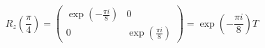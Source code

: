 \begingroup
\newcommand{\expo}[1]{\exp \left( #1 \right)}
\newcommand{\roto}[2]{R_{#1} \left( #2 \right)}
%
$$
\roto{z}{\frac{\pi}{4}} = \begin{pmatrix} \expo{-\frac{\pi i}{8}} & 0 \\ 0 & \expo{\frac{\pi i}{8}} \end{pmatrix} = \expo{-\frac{\pi i}{8}} T
$$
%
\endgroup
